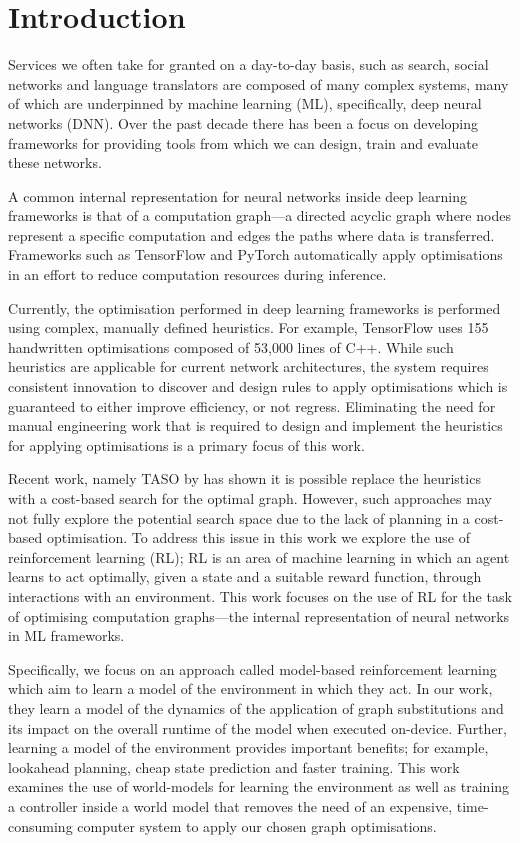 \chapter{Introduction}

Services we often take for granted on a day-to-day basis, such as search, social networks and language translators are composed of many complex systems, many of which are underpinned by machine learning (ML), specifically, deep neural networks (DNN). Over the past decade there has been a focus on developing frameworks for providing tools from which we can design, train and evaluate these networks.

A common internal representation for neural networks inside deep learning frameworks is that of a computation graph---a directed acyclic graph where nodes represent a specific computation and edges the paths where data is transferred. Frameworks such as TensorFlow \cite{tensorflow2015-whitepaper} and PyTorch \cite{pytorch} automatically apply optimisations in an effort to reduce computation resources during inference.

Currently, the optimisation performed in deep learning frameworks is performed using complex, manually defined heuristics. For example, TensorFlow \cite{tensorflow2015-whitepaper} uses 155 handwritten optimisations composed of 53,000 lines of C++. While such heuristics are applicable for current network architectures, the system requires consistent innovation to discover and design rules to apply optimisations which is guaranteed to either improve efficiency, or not regress. Eliminating the need for manual engineering work that is required to design and implement the heuristics for applying optimisations is a primary focus of this work.

Recent work, namely TASO by \citet{jia2019optimizing,jia2019optimizing} has shown it is possible replace the heuristics with a cost-based search for the optimal graph. However, such approaches may not fully explore the potential search space due to the lack of planning in a cost-based optimisation. To address this issue in this work we explore the use of reinforcement learning (RL); RL is an area of machine learning in which an agent learns to act optimally, given a state and a suitable reward function, through interactions with an environment. This work focuses on the use of RL for the task of optimising computation graphs---the internal representation of neural networks in ML frameworks.

Specifically, we focus on an approach called model-based reinforcement learning which aim to learn a model of the environment in which they act. In our work, they learn a model of the dynamics of the application of graph substitutions and its impact on the overall runtime of the model when executed on-device. Further, learning a model of the environment provides important benefits; for example, lookahead planning, cheap state prediction and faster training. This work examines the use of world-models for learning the environment as well as training a controller inside a world model that removes the need of an expensive, time-consuming computer system to apply our chosen graph optimisations.

